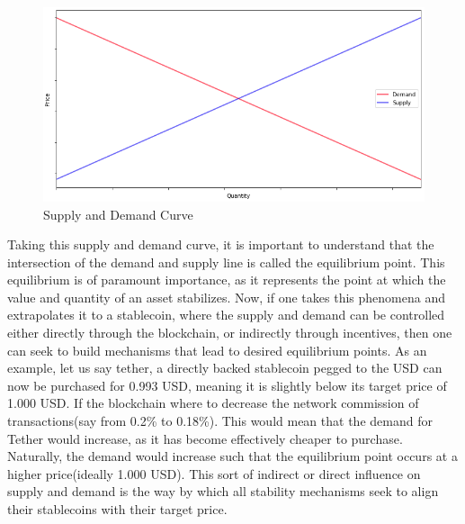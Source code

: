 \documentclass[bsc,frontabs,singlespacing,parskip,deptreport]{infthesis}
\begin{document}
    \begin{figure}[h]
    \centering
      \includegraphics[width=\linewidth]{Images and Figures/supplyanddemand.png}
      \caption{Supply and Demand Curve}
    \end{figure}
    \smallbreak \noindent
    Taking this supply and demand curve, it is important to understand that the intersection of the demand and supply line is called the equilibrium point. This equilibrium is of paramount importance, as it represents the point at which the value and quantity of an asset stabilizes. Now, if one takes this phenomena and extrapolates it to a stablecoin, where the supply and demand can be controlled either directly through the blockchain, or indirectly through incentives, then one can seek to build mechanisms that lead to desired equilibrium points. As an example, let us say tether, a directly backed stablecoin pegged to the USD can now be purchased for 0.993 USD, meaning it is slightly below its target price of 1.000 USD. If the blockchain where to decrease the network commission of transactions(say from 0.2\% to 0.18\%). This would mean that the demand for Tether would increase, as it has become effectively cheaper to purchase. Naturally, the demand would increase such that the equilibrium point occurs at a higher price(ideally 1.000 USD). This sort of indirect or direct influence on supply and demand is the way by which all stability mechanisms seek to align their stablecoins with their target price. 
\end{document}
